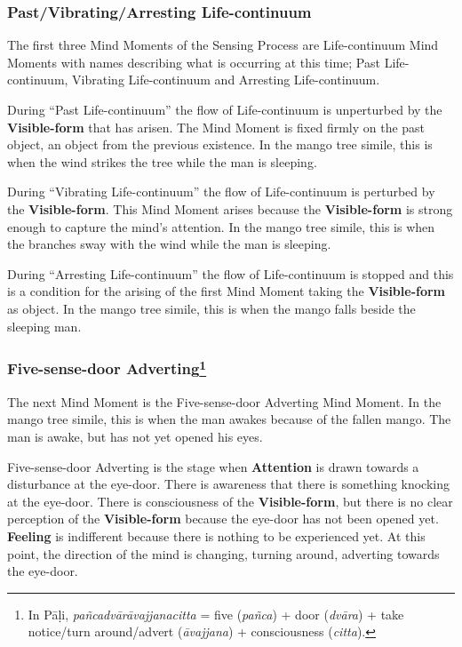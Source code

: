 \subsubsection*{Past/Vibrating/Arresting Life-continuum}

The first three Mind Moments of the Sensing Process are Life-continuum Mind Moments with names describing what is occurring at this time; Past Life-continuum, Vibrating Life-continuum and Arresting Life-continuum.

During “Past Life-continuum” the flow of Life-continuum is unperturbed by the \textbf{Visible-form} that has arisen. The Mind Moment is fixed firmly on the past object, an object from the previous existence. In the mango tree simile, this is when the wind strikes the tree while the man is sleeping.

During “Vibrating Life-continuum” the flow of Life-continuum is perturbed by the \textbf{Visible-form}. This Mind Moment arises because the \textbf{Visible-form} is strong enough to capture the mind’s attention. In the mango tree simile, this is when the branches sway with the wind while the man is sleeping.

During “Arresting Life-continuum” the flow of Life-continuum is stopped and this is a condition for the arising of the first Mind Moment taking the \textbf{Visible-form} as object. In the mango tree simile, this is when the mango falls beside the sleeping man.

\subsubsection*{Five-sense-door Adverting\footnote{In Pāḷi, \textit{pañcadvārāvajjanacitta} = five (\textit{pañca}) + door (\textit{dvāra}) + take notice/turn around/advert (\textit{āvajjana}) + consciousness (\textit{citta}).}}

The next Mind Moment is the Five-sense-door Adverting Mind Moment. In the mango tree simile, this is when the man awakes because of the fallen mango. The man is awake, but has not yet opened his eyes. 

Five-sense-door Adverting is the stage when \textbf{Attention} is drawn towards a disturbance at the eye-door. There is awareness that there is something knocking at the eye-door. There is consciousness of the \textbf{Visible-form}, but there is no clear perception of the \textbf{Visible-form} because the eye-door has not been opened yet. \textbf{Feeling} is indifferent because there is nothing to be experienced yet. At this point, the direction of the mind is changing, turning around, adverting towards the eye-door.

